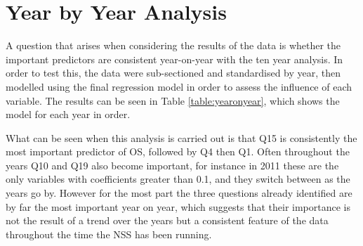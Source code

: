 \documentclass[11pt,a4paper]{report}
\begin{document}
\section{Year by Year Analysis}
A question that arises when considering the results of the data is whether the important predictors are consistent year-on-year with the ten year analysis. In order to test this, the data were sub-sectioned and standardised by year, then modelled using the final regression model in order to assess the influence of each variable. The results can be seen in Table \ref{table:yearonyear}, which shows the model for each year in order. 

What can be seen when this analysis is carried out is that Q15 is consistently the most important predictor of OS, followed by Q4 then Q1. Often throughout the years Q10 and Q19 also become important, for instance in 2011 these are the only variables with coefficients greater than 0.1, and they switch between as the years go by. However for the most part the three questions already identified are by far the most important year on year, which suggests that their importance is not the result of a trend over the years but a consistent feature of the data throughout the time the NSS has been running. 
\end{document}

